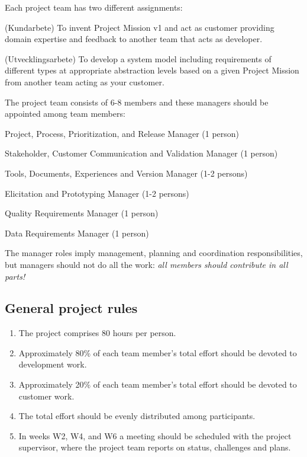 \documentclass[10pt,a4paper]{article}
\begin{document}
\noindent Each project team has two different assignments:
\begin{description}[noitemsep]
\item[Customer work] (Kundarbete) To invent Project Mission v1 and act as customer providing domain expertise and feedback to another team that acts as developer.
\item[Development work] (Utvecklingsarbete) To develop a system model including requirements of different types at appropriate abstraction levels based on a given Project Mission from another team acting as your customer.
\end{description}

\noindent 
The project team consists of 6-8 members and these managers should be appointed among team members:

\begin{description}[noitemsep]
\item[P3RM] Project, Process, Prioritization, and Release Manager (1 person)
\item[SCCVM] Stakeholder, Customer Communication and Validation Manager (1 person) 
\item[TDEVM] Tools, Documents, Experiences and Version Manager (1-2 persons) 
\item [EPM] Elicitation and Prototyping Manager (1-2 persons) 
\item [QRM] Quality Requirements Manager (1 person)
\item [DRM] Data Requirements Manager (1 person)
\end{description}
The manager roles imply management, planning and coordination responsibilities, but managers should not do all the work: {\it all members should contribute in all parts!} 
\subsection{General project rules}
\begin{enumerate}[noitemsep]
\item The project comprises 80 hours per person.
\item Approximately 80\% of each team member's total effort should be devoted to development work.
\item Approximately 20\% of each team member's total effort should be devoted to customer work.
\item The total effort should be evenly distributed among participants.
\item In weeks W2, W4, and W6 a meeting should be scheduled with the project supervisor, where the project team reports on status, challenges and plans. 
\end{enumerate}
\end{document}
